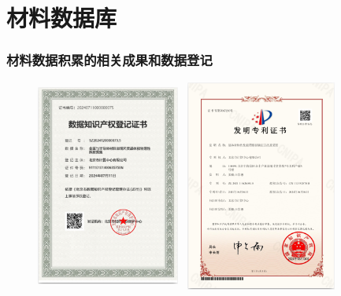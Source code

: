 \section{材料数据库}
\frame
{
	\frametitle{材料数据积累的相关成果和数据登记}
\begin{figure}[h!]
\vspace*{-0.05in}
\centering
\includegraphics[height=2.75in,width=1.85in,viewport=0 0 579 810,clip]{Figures/Registration_Certificate.png}
\includegraphics[height=2.75in,width=2.10in,viewport=0 0 609 799,clip]{Figures/Certificate-of-Patent.png}
\label{Certification}
\end{figure}
}

